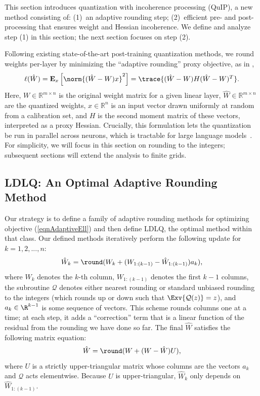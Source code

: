 This section introduces quantization with incoherence processing (QuIP), a new method consisting of:
(1)~an adaptive rounding step;
(2)~efficient pre- and post-processing that ensures weight and Hessian incoherence. We define and analyze step (1) in this section; the next section focuses on step (2).

Following existing state-of-the-art post-training quantization methods, we round weights per-layer by minimizing the ``adaptive rounding'' proxy objective, as in \citet{nagel2020up},
\begin{equation}
    \label{eqnAdaptiveEll}
    \textstyle
    \ell(\hat W)
    =
    \mathbf{E}_x\left[ \norm{ (\hat W - W) x }^2 \right]
    =
    \trace{ (\hat W - W) H (\hat W - W)^T }.
\end{equation}
Here, $W \in \mathbb{R}^{m \times n}$ is the original weight matrix for a given linear layer, $\hat W \in \mathbb{R}^{m \times n}$ are the quantized weights, $x \in \mathbb{R}^n$ is an input vector drawn uniformly at random from a calibration set, and $H$ is the second moment matrix of these vectors, interpreted as a proxy Hessian. Crucially, this formulation lets the quantization be run in parallel across neurons, which 
is tractable for
large language models~\citep{frantar2023gptq}. 
For simplicity, we will focus in this section on rounding to the integers; subsequent sections will extend the analysis to finite grids.


\subsection{LDLQ: An Optimal Adaptive Rounding Method}
Our strategy is to define a family of adaptive rounding methods for optimizing objective (\ref{eqnAdaptiveEll}) and then define LDLQ, the optimal method within that class. Our defined methods iteratively perform the following update for $k=1,2,...,n$:
\[
    \hat W_k = \round( W_k + (W_{1:(k-1)} - \hat W_{1:(k-1)}) a_k),
\]
where $W_k$ denotes the $k$-th column, $W_{1:(k-1)}$ denotes the first $k-1$ columns, the subroutine $\mathcal{Q}$ denotes either nearest rounding or standard unbiased rounding to the integers (which rounds up or down such that $\Exv{\mathcal{Q}(z)} = z$), and $a_k \in \R^{k - 1}$ is some sequence of vectors. 
This scheme rounds columns one at a time; at each step, it adds a ``correction'' term that is a linear function of the residual from the rounding we have done so far. The final $\hat W$ satisfies the following matrix equation:
\begin{equation}
  \label{eqnVectorQuant}
  \hat W = \round( W + (W - \hat W) U),  
\end{equation} 
where $U$ is a strictly upper-triangular matrix whose columns are the vectors $a_k$ and $\mathcal{Q}$ acts elementwise. 
Because $U$ is upper-triangular, $\hat W_k$ only depends on $\hat W_{1:(k-1)}$.

